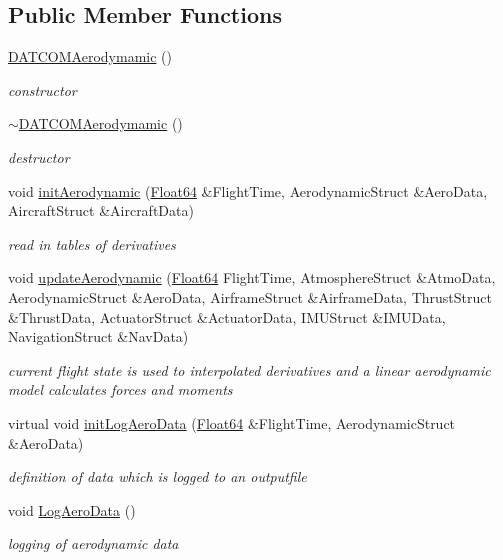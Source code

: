 \subsection*{Public Member Functions}
\begin{DoxyCompactItemize}
\item 
\hyperlink{class_d_a_t_c_o_m_aerodymamic_a03d01a72cf389483e03e2bf6cce33299}{D\+A\+T\+C\+O\+M\+Aerodymamic} ()
\begin{DoxyCompactList}\small\item\em constructor \end{DoxyCompactList}\item 
\hyperlink{class_d_a_t_c_o_m_aerodymamic_a3619e38867cad4b0c8b06a939281a74e}{$\sim$\+D\+A\+T\+C\+O\+M\+Aerodymamic} ()
\begin{DoxyCompactList}\small\item\em destructor \end{DoxyCompactList}\item 
void \hyperlink{class_d_a_t_c_o_m_aerodymamic_aa4909fb5e6db41f2309b7d8a8658a219}{init\+Aerodynamic} (\hyperlink{group___tools_ga3f1431cb9f76da10f59246d1d743dc2c}{Float64} \&Flight\+Time, Aerodynamic\+Struct \&Aero\+Data, Aircraft\+Struct \&Aircraft\+Data)
\begin{DoxyCompactList}\small\item\em read in tables of derivatives \end{DoxyCompactList}\item 
void \hyperlink{class_d_a_t_c_o_m_aerodymamic_a501386a4e5d176d3fb8bddae1d0c8d0f}{update\+Aerodynamic} (\hyperlink{group___tools_ga3f1431cb9f76da10f59246d1d743dc2c}{Float64} Flight\+Time, Atmosphere\+Struct \&Atmo\+Data, Aerodynamic\+Struct \&Aero\+Data, Airframe\+Struct \&Airframe\+Data, Thrust\+Struct \&Thrust\+Data, Actuator\+Struct \&Actuator\+Data, I\+M\+U\+Struct \&I\+M\+U\+Data, Navigation\+Struct \&Nav\+Data)
\begin{DoxyCompactList}\small\item\em current flight state is used to interpolated derivatives and a linear aerodynamic model calculates forces and moments \end{DoxyCompactList}\item 
virtual void \hyperlink{class_d_a_t_c_o_m_aerodymamic_a5bf2796685504755b9d23cb8cfd90752}{init\+Log\+Aero\+Data} (\hyperlink{group___tools_ga3f1431cb9f76da10f59246d1d743dc2c}{Float64} \&Flight\+Time, Aerodynamic\+Struct \&Aero\+Data)
\begin{DoxyCompactList}\small\item\em definition of data which is logged to an outputfile \end{DoxyCompactList}\item 
void \hyperlink{class_d_a_t_c_o_m_aerodymamic_a84ab90acbbec700e0b06272bf95cf932}{Log\+Aero\+Data} ()
\begin{DoxyCompactList}\small\item\em logging of aerodynamic data \end{DoxyCompactList}\end{DoxyCompactItemize}


